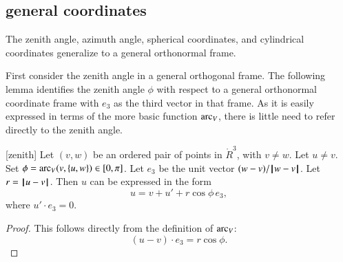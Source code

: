 \subsection{general coordinates}

The zenith angle, azimuth angle,
spherical coordinates, and cylindrical coordinates 
generalize to a general orthonormal frame.

First consider the zenith angle in a general orthogonal frame.
The following lemma identifies the zenith angle $\phi$ with respect to
a general orthonormal coordinate frame with $e_3$ as the third
vector in that frame.  As it is easily expressed in terms
of the more basic function $\operatorname{arc}_V$, 
there is little need to refer directly to the zenith angle.

\begin{lemma}[zenith]
Let $(v,w)$ be an ordered pair of points in $\ring{R}^3$, with $v\ne w$.
Let $u\ne v$.  Set $\phi = \operatorname{arc}_V(v,\{u,w\})\in[0,\pi]$.
Let $e_3$ be the unit vector $(w-v)/{\hskip0.1em|\hskip-0.15em|\hskip0.1em}w - v{\hskip0.1em|\hskip-0.15em|\hskip0.1em}$.  Let $r = {\hskip0.1em|\hskip-0.15em|\hskip0.1em}u - v{\hskip0.1em|\hskip-0.15em|\hskip0.1em}$.
Then $u$
can be expressed in the form
   $$
   u = v + u' +
   r\cos\phi\, e_3,
   $$
where $u'\cdot e_3 = 0$.
\end{lemma}

\begin{proof} This follows directly from the definition of $\operatorname{arc}_V$:
  $$(u-v)\cdot e_3 = r\cos\phi.$$
\end{proof}



